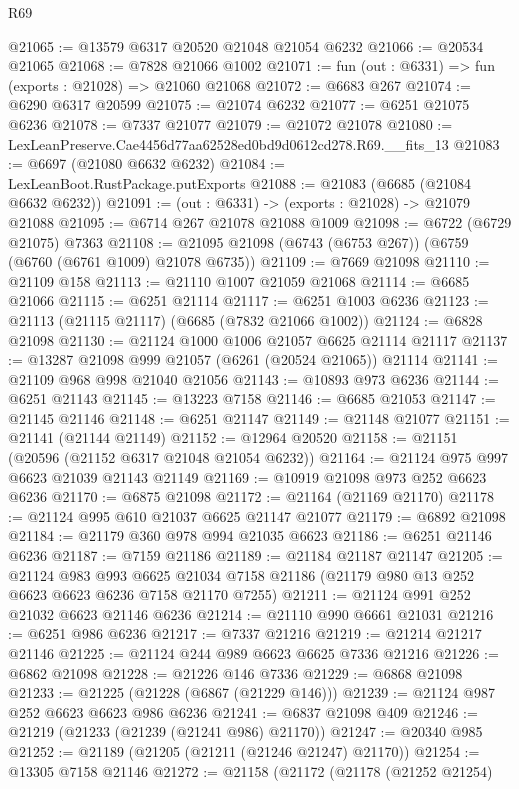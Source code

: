 \begin{lexlean}{R69}
\begin{coremodule}
{@21065 := @13579 @6317 @20520 @21048 @21054 @6232
@21066 := @20534 @21065
@21068 := @7828 @21066 @1002
@21071 := fun (out : @6331) => fun (exports : @21028) => @21060 @21068
@21072 := @6683 @267
@21074 := @6290 @6317 @20599
@21075 := @21074 @6232
@21077 := @6251 @21075 @6236
@21078 := @7337 @21077
@21079 := @21072 @21078
@21080 := LexLeanPreserve.Cae4456d77aa62528ed0bd9d0612cd278.R69.__fits_13
@21083 := @6697 (@21080 @6632 @6232)
@21084 := LexLeanBoot.RustPackage.putExports
@21088 := @21083 (@6685 (@21084 @6632 @6232))
@21091 := (out : @6331) -> (exports : @21028) -> @21079 @21088
@21095 := @6714 @267 @21078 @21088 @1009
@21098 := @6722 (@6729 @21075) @7363
@21108 := @21095 @21098 (@6743 (@6753 @267)) (@6759 (@6760 (@6761 @1009) @21078 @6735))
@21109 := @7669 @21098
@21110 := @21109 @158
@21113 := @21110 @1007 @21059 @21068
@21114 := @6685 @21066
@21115 := @6251 @21114
@21117 := @6251 @1003 @6236
@21123 := @21113 (@21115 @21117) (@6685 (@7832 @21066 @1002))
@21124 := @6828 @21098
@21130 := @21124 @1000 @1006 @21057 @6625 @21114 @21117
@21137 := @13287 @21098 @999 @21057 (@6261 (@20524 @21065)) @21114
@21141 := @21109 @968 @998 @21040 @21056
@21143 := @10893 @973 @6236
@21144 := @6251 @21143
@21145 := @13223 @7158
@21146 := @6685 @21053
@21147 := @21145 @21146
@21148 := @6251 @21147
@21149 := @21148 @21077
@21151 := @21141 (@21144 @21149)
@21152 := @12964 @20520
@21158 := @21151 (@20596 (@21152 @6317 @21048 @21054 @6232))
@21164 := @21124 @975 @997 @6623 @21039 @21143 @21149
@21169 := @10919 @21098 @973 @252 @6623 @6236
@21170 := @6875 @21098
@21172 := @21164 (@21169 @21170)
@21178 := @21124 @995 @610 @21037 @6625 @21147 @21077
@21179 := @6892 @21098
@21184 := @21179 @360 @978 @994 @21035 @6623
@21186 := @6251 @21146 @6236
@21187 := @7159 @21186
@21189 := @21184 @21187 @21147
@21205 := @21124
    @983
    @993
    @6625
    @21034
    @7158
    @21186
    (@21179 @980 @13 @252 @6623 @6623 @6236 @7158 @21170 @7255)
@21211 := @21124 @991 @252 @21032 @6623 @21146 @6236
@21214 := @21110 @990 @6661 @21031
@21216 := @6251 @986 @6236
@21217 := @7337 @21216
@21219 := @21214 @21217 @21146
@21225 := @21124 @244 @989 @6623 @6625 @7336 @21216
@21226 := @6862 @21098
@21228 := @21226 @146 @7336
@21229 := @6868 @21098
@21233 := @21225 (@21228 (@6867 (@21229 @146)))
@21239 := @21124 @987 @252 @6623 @6623 @986 @6236
@21241 := @6837 @21098 @409
@21246 := @21219 (@21233 (@21239 (@21241 @986) @21170))
@21247 := @20340 @985
@21252 := @21189 (@21205 (@21211 (@21246 @21247) @21170))
@21254 := @13305 @7158 @21146
@21272 := @21158
    (@21172
      (@21178
        (@21252 @21254)
}
\end{coremodule}
\end{lexlean}
